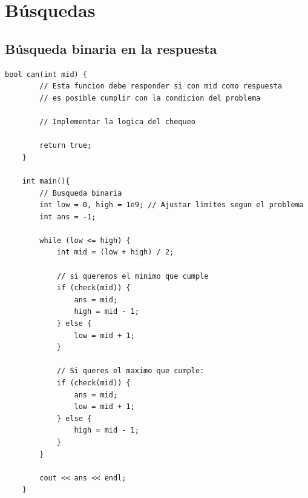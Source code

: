 \chapter{Búsquedas}

\section{Búsqueda binaria en la respuesta}

\begin{lstlisting}[style=cppstyle, caption={Busqueda binaria en la respuesta}]
	bool can(int mid) {
		// Esta funcion debe responder si con mid como respuesta
		// es posible cumplir con la condicion del problema
		
		// Implementar la logica del chequeo
		
		return true;
	}
	
	int main(){
		// Busqueda binaria
		int low = 0, high = 1e9; // Ajustar limites segun el problema
		int ans = -1;
		
		while (low <= high) {
			int mid = (low + high) / 2;
			
			// si queremos el minimo que cumple
			if (check(mid)) {
				ans = mid;        
				high = mid - 1;
			} else {
				low = mid + 1;
			}
			
			// Si queres el maximo que cumple:
			if (check(mid)) {
				ans = mid;
				low = mid + 1;
			} else {
				high = mid - 1;
			}
		}
		
		cout << ans << endl;
	}
	
\end{lstlisting}

